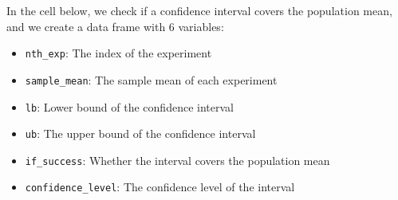 \documentclass[
]{article}
\providecommand{\tightlist}{%
  \setlength{\itemsep}{0pt}\setlength{\parskip}{0pt}}
\begin{document}
In the cell below, we check if a confidence interval covers the
population mean, and we create a data frame with 6 variables:

\begin{itemize}
\tightlist
\item
  \texttt{nth\_exp}: The index of the experiment
\item
  \texttt{sample\_mean}: The sample mean of each experiment
\item
  \texttt{lb}: Lower bound of the confidence interval
\item
  \texttt{ub}: The upper bound of the confidence interval
\item
  \texttt{if\_success}: Whether the interval covers the population mean
\item
  \texttt{confidence\_level}: The confidence level of the interval
\end{itemize}
\end{document}
